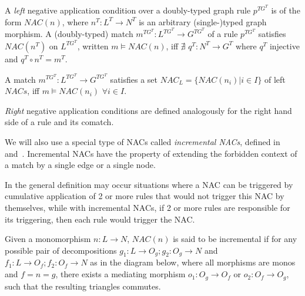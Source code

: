 \begin{definition} A \emph{left} negative application condition over a doubly-typed graph rule $p^{TG^T}$ is of the form $NAC(n)$, where $n^T : L^T \rightarrow N^T$ is an arbitrary (single-)typed graph morphism. A  (doubly-typed) match $m^{TG^T} : L^{TG^T} \rightarrow G^{TG^T}$ of a rule $p^{TG^T}$ satisfies $NAC(n^T)$ on $L^{TG^T}$, written \mbox{$m \models NAC(n)$}, iff $\nexists$ $q^T : N^T \rightarrow G^T$ where $q^T$ injective and $q^T \circ n^T = m^T$.


  A match $m^{TG^T} : L^{TG^T} \rightarrow G^{TG^T}$ satisfies a set \mbox{$NAC_L = \{NAC\left(n_i\right)|i \in I\}$} of left $NACs$, iff \mbox{$m \models NAC\left(n_i\right)$} $\forall i \in I$.

\emph{Right} negative application conditions are defined analogously for the right hand side of a rule and its comatch.


\end{definition}

\begin{example}
\end{example}

We will also use a special type of NACs called \emph{incremental NACs}, defined in~\cite{Corradini2013} and~\cite{Corradini2014}. Incremental NACs have the property of extending the forbidden context of a match by a single edge or a single node. 

In the general definition may occur situations where a NAC can be triggered by cumulative application of 2 or more rules that would not trigger this NAC by themselves, while with incremental NACs, if 2 or more rules are responsible for its triggering, then each rule would trigger the NAC.

\begin{definition} Given a monomorphism \mbox{$n : L \rightarrow N$}, $NAC(n)$ is said to be incremental if for any possible pair of decompositions \mbox{$g_1 : L \rightarrow O_g;g_2 : O_g \rightarrow N$} and \mbox{$f_1 : L \rightarrow O_f;f_2 : O_f \rightarrow N$} as in the diagram below, where all morphisms are monos and $f = n = g$, there exists a mediating morphism $o_1 : O_g \rightarrow O_f$ or $o_2 : O_f \rightarrow O_g$, such that the resulting triangles commutes.



\end{definition}


